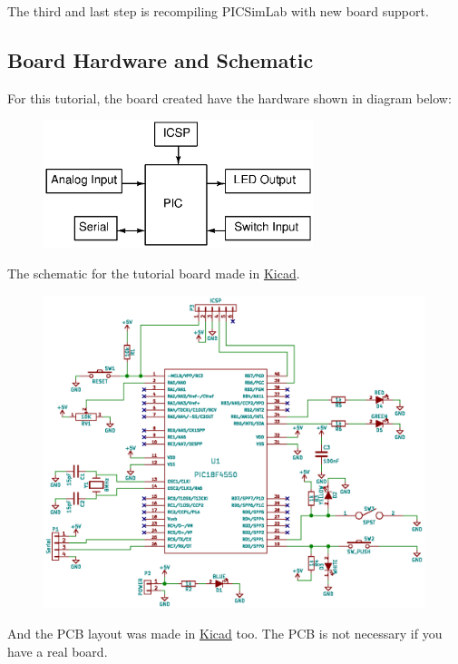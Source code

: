 The third and last step is recompiling PICSimLab with new board support.

\subsection{Board Hardware and Schematic}

For this tutorial, the board created have the hardware shown in diagram below:
\begin{figure}[H]
\center
\includegraphics[width=0.7\textwidth]{img/hb/blocks.eps} 
\end{figure} 

The schematic for the tutorial board made in \href{http://kicad-pcb.org/}{Kicad}.
\begin{figure}[H]
\center
\includegraphics[width=0.99\textwidth]{board_x/board_x.eps} 
\end{figure} 

\pagebreak
And the PCB layout was made in \href{http://kicad-pcb.org/}{Kicad} too. The PCB is not necessary if you have a real board.


